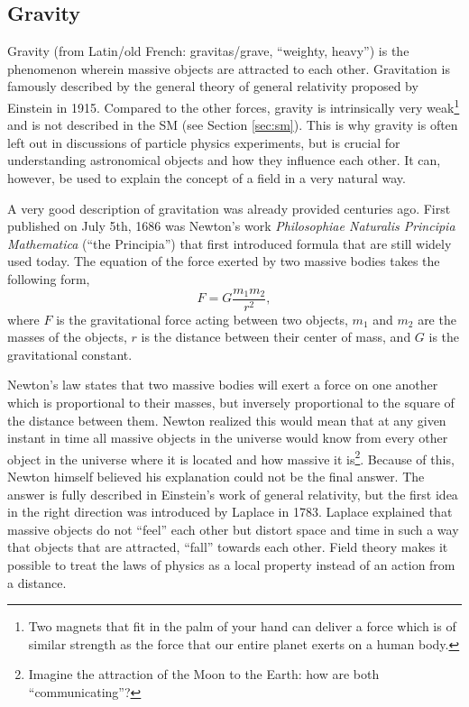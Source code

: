 \subsection{Gravity}
Gravity (from Latin/old French: gravitas/grave, ``weighty, heavy'') is the phenomenon wherein massive objects are attracted to each other. Gravitation is famously described by the general theory of general relativity proposed by Einstein in 1915. Compared to the other forces, gravity is intrinsically very weak\footnote{Two magnets that fit in the palm of your hand can deliver a force which is of similar strength as the force that our entire planet exerts on a human body.} and is not described in the SM (see Section \ref{sec:sm}). This is why gravity is often left out in discussions of particle physics experiments, but is crucial for understanding astronomical objects and how they influence each other. It can, however, be used to explain the concept of a field in a very natural way.

A very good description of gravitation was already provided centuries ago. First published on July 5th, 1686 was Newton's work \textit{Philosophiae Naturalis Principia Mathematica} (``the Principia'') that first introduced formula that are still widely used today. The equation of the force exerted by two massive bodies takes the following form,
\begin{equation}
F = G \frac{m_1 m_2}{r^2},
\end{equation}
where $F$ is the gravitational force acting between two objects, $m_1$ and $m_2$ are the masses of the objects, $r$ is the distance between their center of mass, and $G$ is the gravitational constant.

Newton's law states that two massive bodies will exert a force on one another which is proportional to their masses, but inversely proportional to the square of the distance between them. Newton realized this would mean that at any given instant in time all massive objects in the universe would know from every other object in the universe where it is located and how massive it is\footnote{Imagine the attraction of the Moon to the Earth: how are both ``communicating''?}. Because of this, Newton himself believed his explanation could not be the final answer. The answer is fully described in Einstein's work of general relativity, but the first idea in the right direction was introduced by Laplace in 1783. Laplace explained that massive objects do not ``feel'' each other but distort space and time in such a way that objects that are attracted, ``fall'' towards each other. Field theory makes it possible to treat the laws of physics as a local property instead of an action from a distance.


